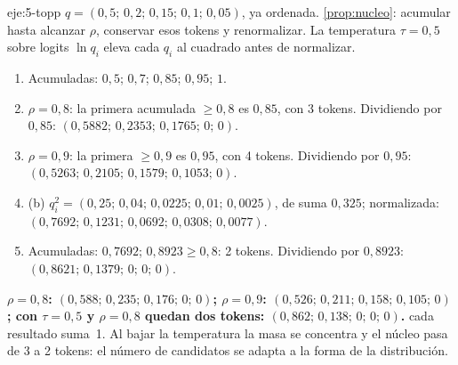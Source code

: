 \begin{solucion}{eje:5-topp}
\datos $q=(0{,}5;\allowbreak\,0{,}2;\allowbreak\,0{,}15;\allowbreak\,0{,}1;\allowbreak\,0{,}05)$, ya ordenada.
\planteamiento \cref{prop:nucleo}: acumular hasta alcanzar $\rho$, conservar esos tokens y renormalizar. La temperatura $\tau=0{,}5$ sobre logits $\ln q_i$ eleva cada $q_i$ al cuadrado antes de normalizar.
\pasos
\begin{enumerate}[label=\arabic*.]
  \item Acumuladas: $0{,}5$; $0{,}7$; $0{,}85$; $0{,}95$; $1$.
  \item $\rho=0{,}8$: la primera acumulada $\ge 0{,}8$ es $0{,}85$, con 3 tokens. Dividiendo por $0{,}85$: $(0{,}5882;\allowbreak\,0{,}2353;\allowbreak\,0{,}1765;\allowbreak\,0;\allowbreak\,0)$.
  \item $\rho=0{,}9$: la primera $\ge 0{,}9$ es $0{,}95$, con 4 tokens. Dividiendo por $0{,}95$: $(0{,}5263;\allowbreak\,0{,}2105;\allowbreak\,0{,}1579;\allowbreak\,0{,}1053;\allowbreak\,0)$.
  \item (b) $q_i^{2}=(0{,}25;\allowbreak\,0{,}04;\allowbreak\,0{,}0225;\allowbreak\,0{,}01;\allowbreak\,0{,}0025)$, de suma $0{,}325$; normalizada: $(0{,}7692;\allowbreak\,0{,}1231;\allowbreak\,0{,}0692;\allowbreak\,0{,}0308;\allowbreak\,0{,}0077)$.
  \item Acumuladas: $0{,}7692$; $0{,}8923\ge 0{,}8$: 2 tokens. Dividiendo por $0{,}8923$: $(0{,}8621;\allowbreak\,0{,}1379;\allowbreak\,0;\allowbreak\,0;\allowbreak\,0)$.
\end{enumerate}
\resultado \textbf{$\rho=0{,}8$: $(0{,}588;\allowbreak\,0{,}235;\allowbreak\,0{,}176;\allowbreak\,0;\allowbreak\,0)$; $\rho=0{,}9$: $(0{,}526;\allowbreak\,0{,}211;\allowbreak\,0{,}158;\allowbreak\,0{,}105;\allowbreak\,0)$; con $\tau=0{,}5$ y $\rho=0{,}8$ quedan dos tokens: $(0{,}862;\allowbreak\,0{,}138;\allowbreak\,0;\allowbreak\,0;\allowbreak\,0)$.}
\comprobacion cada resultado suma~1. Al bajar la temperatura la masa se concentra y el núcleo pasa de 3 a 2 tokens: el número de candidatos se adapta a la forma de la distribución.
\end{solucion}

